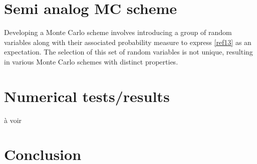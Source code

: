 \documentclass[a4paper, 11pt]{article}
\begin{document}
\section{Semi analog MC scheme}

Developing a Monte Carlo scheme involves introducing a group of random variables along with their associated probability measure to express \ref{ref13} as an expectation. The selection of this set of random variables is not unique, resulting in various Monte Carlo schemes with distinct properties.

\section{Numerical tests/results}

à voir

\section{Conclusion}


	
	
\end{document}
